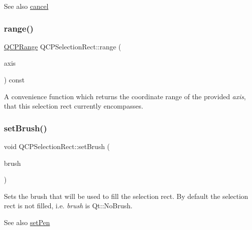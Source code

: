 \begin{DoxySeeAlso}{See also}
\hyperlink{class_q_c_p_selection_rect_af67bc58f4f5ce9a4dc420b9c42de235a}{cancel} 
\end{DoxySeeAlso}
\mbox{\label{class_q_c_p_selection_rect_a23ab082ffa04be1dbf9afb9e633ab815}} 
\subsubsection{\texorpdfstring{range()}{range()}}
{\footnotesize\ttfamily \hyperlink{class_q_c_p_range}{Q\+C\+P\+Range} Q\+C\+P\+Selection\+Rect\+::range (\begin{DoxyParamCaption}\item[{const \hyperlink{class_q_c_p_axis}{Q\+C\+P\+Axis} $\ast$}]{axis }\end{DoxyParamCaption}) const}

A convenience function which returns the coordinate range of the provided {\itshape axis}, that this selection rect currently encompasses. \mbox{\label{class_q_c_p_selection_rect_ab0c66f1484418782efa01f4153611080}} 
\subsubsection{\texorpdfstring{set\+Brush()}{setBrush()}}
{\footnotesize\ttfamily void Q\+C\+P\+Selection\+Rect\+::set\+Brush (\begin{DoxyParamCaption}\item[{const Q\+Brush \&}]{brush }\end{DoxyParamCaption})}

Sets the brush that will be used to fill the selection rect. By default the selection rect is not filled, i.\+e. {\itshape brush} is {\ttfamily Qt\+::\+No\+Brush}.

\begin{DoxySeeAlso}{See also}
\hyperlink{class_q_c_p_selection_rect_ada20b7fb1b2dcbe50523262636b06963}{set\+Pen} 
\end{DoxySeeAlso}
\mbox{\label{class_q_c_p_selection_rect_ada20b7fb1b2dcbe50523262636b06963}} 
